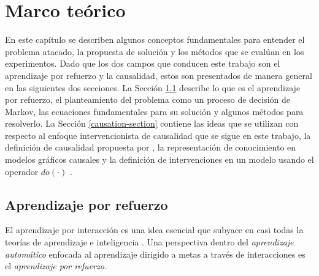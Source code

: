 
\chapter{Marco teórico}\label{chapter2}

\graphicspath{{Chapter2/Figs/}}



En este capítulo se describen algunos conceptos fundamentales para entender
el problema atacado, la propuesta de solución y los métodos que 
se evalúan en los experimentos.
Dado que los dos campos que conducen este trabajo son
el aprendizaje por refuerzo y la causalidad, estos son
presentados de manera general en las siguientes dos
secciones.
La Sección \ref{rl-section} describe lo que es el aprendizaje
por refuerzo, el planteamiento del problema
como un proceso de decisión de Markov, las ecuaciones
fundamentales para su solución y algunos métodos para
resolverlo.
La Sección \ref{causation-section} contiene las ideas que se utilizan
con respecto al enfoque intervencionista de causalidad que se sigue en este trabajo, la definición de causalidad propuesta
por \cite{spirtes2000causation}, la 
representación de conocimiento en modelos gráficos 
causales y la definición de intervenciones en un modelo usando el operador $do(\cdot)$ \cite{pearl_2009}.

\section{Aprendizaje por refuerzo}\label{rl-section}

El aprendizaje por interacción es una idea esencial que subyace en casi todas la teorías
de aprendizaje e inteligencia \cite{sutton_barto_2018}.
Una perspectiva dentro del \textit{aprendizaje automático} \cite{Goodfellow-et-al-2016} enfocada al aprendizaje dirigido a metas a través de interacciones es el \textit{aprendizaje por refuerzo}.

